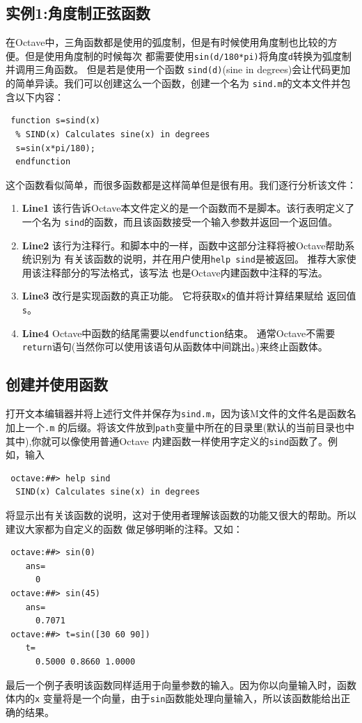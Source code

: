 \documentclass[UTF8,adobefonts]{ctexart}
\begin{document}
\subsection{实例1:角度制正弦函数}
在Octave中，三角函数都是使用的弧度制，但是有时候使用角度制也比较的方便。但是使用角度制的时候每次
都需要使用{\tt sin(d/180*pi)}将角度{\tt d}转换为弧度制并调用三角函数。 但是若是使用一个函数
{\tt sind(d)}(sine in degrees)会让代码更加的简单异读。我们可以创建这么一个函数，创建一个名为
{\tt sind.m}的文本文件并包含以下内容：
\begin{verbatim}
 function s=sind(x)
  % SIND(x) Calculates sine(x) in degrees
  s=sin(x*pi/180);
  endfunction
\end{verbatim}
这个函数看似简单，而很多函数都是这样简单但是很有用。我们逐行分析该文件：
\begin{enumerate}
 \item {\bf Line1} 该行告诉Octave本文件定义的是一个函数而不是脚本。该行表明定义了一个名为
{\tt sind}的函数，而且该函数接受一个输入参数并返回一个返回值。
 \item {\bf Line2} 该行为注释行。和脚本中的一样，函数中这部分注释将被Octave帮助系统识别为
有关该函数的说明，并在用户使用{\tt help sind}是被返回。 推荐大家使用该注释部分的写法格式，该写法
也是Octave内建函数中注释的写法。
 \item {\bf Line3} 改行是实现函数的真正功能。 它将获取{\tt x}的值并将计算结果赋给
返回值{\tt s}。
 \item {\bf Line4} Octave中函数的结尾需要以{\tt endfunction}结束。 通常Octave不需要
{\tt return}语句(当然你可以使用该语句从函数体中间跳出。)来终止函数体。 
\end{enumerate}
\subsection{创建并使用函数}
打开文本编辑器并将上述行文件并保存为{\tt sind.m}，因为该M文件的文件名是函数名加上一个{\tt .m}
的后缀。将该文件放到{\tt path}变量中所在的目录里(默认的当前目录也中其中),你就可以像使用普通Octave
内建函数一样使用字定义的{\tt sind}函数了。例如，输入
\begin{verbatim}
 octave:##> help sind
  SIND(x) Calculates sine(x) in degrees
\end{verbatim}
将显示出有关该函数的说明，这对于使用者理解该函数的功能又很大的帮助。所以建议大家都为自定义的函数
做足够明晰的注释。又如：
\begin{verbatim}
 octave:##> sin(0)
    ans=
      0
 octave:##> sin(45)
    ans=
      0.7071
 octave:##> t=sin([30 60 90])
    t=
      0.5000 0.8660 1.0000
\end{verbatim}
最后一个例子表明该函数同样适用于向量参数的输入。因为你以向量输入时，函数体内的{\tt x}
变量将是一个向量，由于{\tt sin}函数能处理向量输入，所以该函数能给出正确的结果。
\end{document}
